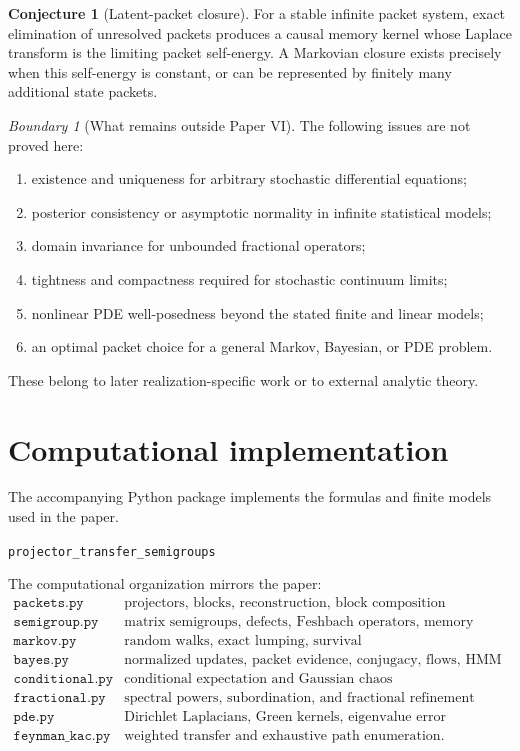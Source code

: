\documentclass[11pt]{article}
\theoremstyle{definition}
\newtheorem{conjecture}[theorem]{Conjecture}
\theoremstyle{remark}
\newtheorem{boundary}[theorem]{Boundary}
\begin{document}
\begin{conjecture}[Latent-packet closure]
For a stable infinite packet system, exact elimination of unresolved packets produces a causal memory kernel whose Laplace transform is the limiting packet self-energy. A Markovian closure exists precisely when this self-energy is constant, or can be represented by finitely many additional state packets.
\end{conjecture}

\begin{boundary}[What remains outside Paper VI]
The following issues are not proved here:
\begin{enumerate}[leftmargin=2em]
\item existence and uniqueness for arbitrary stochastic differential equations;
\item posterior consistency or asymptotic normality in infinite statistical models;
\item domain invariance for unbounded fractional operators;
\item tightness and compactness required for stochastic continuum limits;
\item nonlinear PDE well-posedness beyond the stated finite and linear models;
\item an optimal packet choice for a general Markov, Bayesian, or PDE problem.
\end{enumerate}
These belong to later realization-specific work or to external analytic theory.
\end{boundary}

\section{Computational implementation}

The accompanying Python package implements the formulas and finite models used in the paper.
\begin{center}
\texttt{projector\_transfer\_semigroups}
\end{center}
The computational organization mirrors the paper:
\[
\begin{array}{c|l}
\texttt{packets.py} & \text{projectors, blocks, reconstruction, block composition}\\
\texttt{semigroup.py} & \text{matrix semigroups, defects, Feshbach operators, memory}\\
\texttt{markov.py} & \text{random walks, exact lumping, survival}\\
\texttt{bayes.py} & \text{normalized updates, packet evidence, conjugacy, flows, HMM}\\
\texttt{conditional.py} & \text{conditional expectation and Gaussian chaos}\\
\texttt{fractional.py} & \text{spectral powers, subordination, and fractional refinement certificates}\\
\texttt{pde.py} & \text{Dirichlet Laplacians, Green kernels, eigenvalue error}\\
\texttt{feynman\_kac.py} & \text{weighted transfer and exhaustive path enumeration}.
\end{array}
\]
\end{document}
